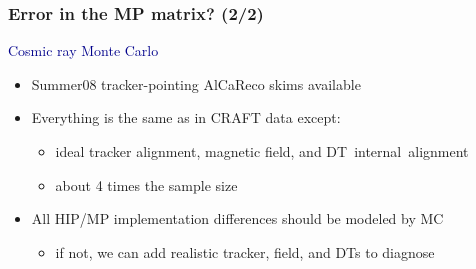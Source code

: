 \documentclass[compress]{beamer}
\begin{document}
\begin{frame}
\frametitle{Error in the MP matrix? (2/2)}

\vspace{0.5 cm}
\hspace{-0.83 cm} \textcolor{darkblue}{\Large Cosmic ray Monte Carlo}

\begin{itemize}
\item Summer08 tracker-pointing AlCaReco skims available
\item Everything is the same as in CRAFT data except:
\begin{itemize}\setlength{\itemsep}{0.1 cm}
\item ideal tracker alignment, magnetic field, and \mbox{DT internal alignment\hspace{-1 cm}}
\item about 4 times the sample size
\end{itemize}

\item All HIP/MP implementation differences should be modeled by MC
\begin{itemize}
\item if not, we can add realistic tracker, field, and DTs to diagnose
\end{itemize}
\end{itemize}
\end{frame}
\end{document}
